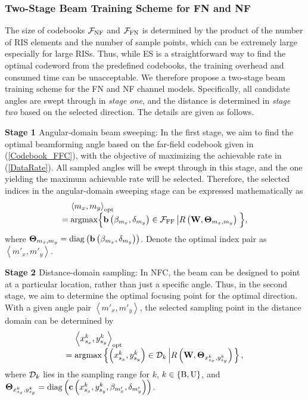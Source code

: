 \documentclass[lettersize, journal]{IEEEtran}
\begin{document}
\subsubsection{ Two-Stage Beam Training Scheme for FN and NF }  


The size of codebooks ${\cal{F}}_{\rm{NF}}$ and ${\cal{F}}_{\rm{FN}}$ is determined by the product of the number of RIS elements and the number of sample points, which can be extremely large especially for large RISs.
Thus, while ES is a straightforward way to find the optimal codeword from the predefined codebooks, the training overhead and consumed time can be unacceptable. 
We therefore propose a two-stage beam training scheme for the FN and NF channel models.
Specifically, all candidate angles are swept through in {\textit{stage one}}, and the distance is determined in {\textit{stage two}} based on the selected direction.
The details are given as follows.

{\bf{Stage 1 }} Angular-domain beam sweeping: 
In the first stage, we aim to find the optimal beamforming angle based on the far-field codebook given in (\ref{Codebook_FFC}), with the objective of maximizing the achievable rate in (\ref{DataRate}).
All sampled angles will be swept through in this stage, and the one yielding the maximum achievable rate will be selected. 
Therefore, the selected indices in the angular-domain sweeping stage can be expressed mathematically as
\begin{equation}
\begin{array}{l}
\;\;\;\; \left \langle m_x, m_y \right \rangle_{\rm{opt}}  \\
= {\rm{argmax}}\Big\{ {{\bf{b}}}\left( {\beta_{m_x}, \delta_{m_y} } \right) \in {\cal{F}}_{\rm{FF}} \left |  R \left( {\bf{W}}, {\bf{\Theta }}_{{m_x, m_y }} \right)   \right.\Big\},
\end{array}
\end{equation}
where ${\bf{\Theta }}_{{m_x, m_y }} = {\rm diag} \left( {{\bf{b}}}\left( {\beta_{m_x}, \delta_{m_y}} \right) \right)$. 
Denote the optimal index pair as $\left \langle m'_x, m'_y \right \rangle$. 

{\bf{Stage 2 }} Distance-domain sampling: 
In NFC, the beam can be designed to point at a particular location, rather than just a specific angle.
Thus, in the second stage, we aim to determine the optimal focusing point for the optimal direction.
With a given angle pair $\left \langle m'_x, m'_y \right \rangle$, the selected sampling point in the distance domain can be determined by
\begin{equation}
\begin{array}{l}
\;\;\;\; \left \langle  x_{s_x}^k, y_{s_y}^k \right \rangle _{\rm{opt}}  \\
= {\rm{argmax}}\left\{ \left(  x_{s_x}^k, y_{s_y}^k \right) \in {\cal{D}}_{k} \left |  R \left( {\bf{W}}, {\bf{\Theta }}_{x_{s_x}^k, y_{s_y}^k} \right)   \right.\right\},
\end{array}
\end{equation}
where ${\cal{D}}_{k}$ lies in the sampling range for $k$, $k \in \left\{ {\rm{B}}, {\rm{U}} \right\}$, and ${\bf{\Theta }}_{x_{s_x}^k, y_{s_y}^k} = {\rm diag} \left( {{\bf{c}}}\left(  x_{s_x}^k, y_{s_y}^k, \beta_{m'_x}, \delta_{m'_y} \right) \right)$.
\end{document}
